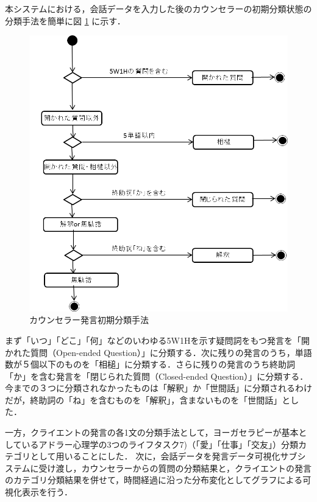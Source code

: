 \documentclass[shuuron]{kuee}
\begin{document}
本システムにおける，会話データを入力した後のカウンセラーの初期分類状態の分類手法を簡単に図
\ref{fig:5_2}
に示す．
\begin{figure}
  \begin{center}
    \includegraphics[width=\linewidth]{5_2.png}
  \end{center}
  \caption{カウンセラー発言初期分類手法}
  \label{fig:5_2}
\end{figure}
まず「いつ」「どこ」「何」などのいわゆる5W1Hを示す疑問詞をもつ発言を「開かれた質問（Open-ended Question）」に分類する．次に残りの発言のうち，単語数が５個以下のものを「相槌」に分類する．さらに残りの発言のうち終助詞「か」を含む発言を「閉じられた質問（Closed-ended Question）」に分類する．今までの３つに分類されなかったものは「解釈」か「世間話」に分類されるわけだが，終助詞の「ね」を含むものを「解釈」，含まないものを「世間話」とした．



一方，クライエントの発言の各1文の分類手法として，ヨーガセラピーが基本としているアドラー心理学の3つのライフタスク7)（「愛」「仕事」「交友」）分類カテゴリとして用いることにした．
次に，会話データを発言データ可視化サブシステムに受け渡し，カウンセラーからの質問の分類結果と，クライエントの発言のカテゴリ分類結果を併せて，時間経過に沿った分布変化としてグラフによる可視化表示を行う．
\end{document}
